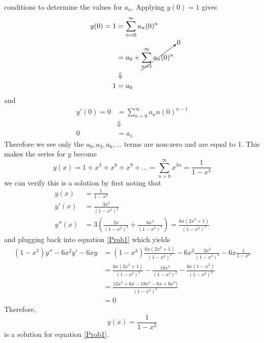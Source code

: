 \documentclass[11pt]{article}
\numberwithin{equation}{section}
\begin{document}
conditions to determine the values for $a_n$. Applying $y(0) = 1$ gives
\begin{align*}
y(0) = 1 &=  \sum_{n=0}^{\infty}a_n(0)^n\\
&= a_0 + \cancelto{0}{\sum_{n=1}^{\infty}a_n(0)^n}\\
&\Downarrow\\
1 &= a_0
\end{align*}
and
\begin{align*}
y'(0) = 0 &=   \sum_{n=0}^{\infty}a_nn(0)^{n-1}\\
&\Downarrow\\
0 &= a_1
\end{align*}
Therefore we see only the $a_0,a_3,a_6,...$ terms are non-zero and are equal to 1. This 
makes the series for $y$ become
$$y(x) = 1 + x^3 + x^6 + x^9 +... =\sum_{n=0}^{\infty}x^{3n} = \frac{1}{1-x^3}$$
we can verify this is a solution by first noting that
\begin{align*}
y(x) &= \frac{1}{1-x^3}\\
y'(x) &= \frac{3x^2}{(1-x^3)^2}\\
y''(x) &= 3\left(\frac{2x}{(1-x^3)^2} + \frac{6x^4}{(1-x^3)^3}\right) = \frac{6x(2x^3+1)}{(1-x^3)^3}
\end{align*}
and plugging back into equation \ref{Prob1} which yields
\begin{align*}
(1-x^3)y''-6x^2y'-6xy &= (1-x^3)\frac{6x(2x^3+1)}{(1-x^3)^3} - 6x^2\frac{3x^2}{(1-x^3)^2} - 6x\frac{1}{1-x^3}\\
&= \frac{6x(2x^3+1)}{(1-x^3)^2} - \frac{18x^4}{(1-x^3)^2} - \frac{6x(1-x^3)}{(1-x^3)^2}\\ 
&= \frac{12x^4+6x-18x^4-6x+6x^4)}{(1-x^3)^2}\\
&=0
\end{align*}
Therefore, 
$$y(x) = \frac{1}{1-x^3}$$
is a solution for equation \ref{Prob1}.

\pagebreak
\end{document}
